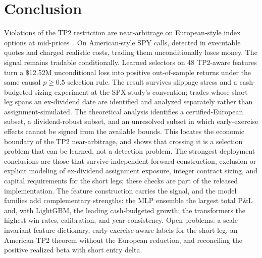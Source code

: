 \documentclass[sigconf,review]{acmart}
\begin{document}
\section{Conclusion}
Violations of the TP2 restriction are near-arbitrage on European-style index options at mid-prices~\cite{glasserman2025tp2,glasserman2026tp2theory}. On American-style SPY calls, detected in executable quotes and charged realistic costs, trading them unconditionally loses money. The signal remains tradable conditionally. Learned selectors on 48 TP2-aware features turn a \$12.52M unconditional loss into positive out-of-sample returns under the same causal $p\ge0.5$ selection rule. The result survives slippage stress and a cash-budgeted sizing experiment at the SPX study's convention; trades whose short leg spans an ex-dividend date are identified and analyzed separately rather than assignment-simulated. The theoretical analysis identifies a certified-European subset, a dividend-robust subset, and an unresolved subset in which early-exercise effects cannot be signed from the available bounds. This locates the economic boundary of the TP2 near-arbitrage, and shows that crossing it is a selection problem that can be learned, not a detection problem. The strongest deployment conclusions are those that survive independent forward construction, exclusion or explicit modeling of ex-dividend assignment exposure, integer contract sizing, and capital requirements for the short legs; these checks are part of the released implementation. The feature construction carries the signal, and the model families add complementary strengths: the MLP ensemble the largest total P\&L and, with LightGBM, the leading cash-budgeted growth; the transformers the highest win rates, calibration, and year-consistency. Open problems: a scale-invariant feature dictionary, early-exercise-aware labels for the short leg, an American TP2 theorem without the European reduction, and reconciling the positive realized beta with short entry delta.
\end{document}
